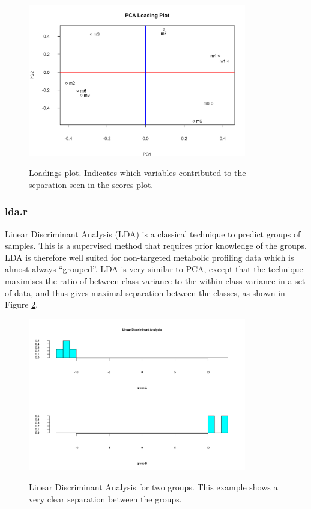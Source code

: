 \documentclass[english,a4paper,12pt]{article}
\begin{document}
\begin{figure}[p]
\centering
\includegraphics[width=0.85\textwidth]{images/PCA_loadings.png} \\
\caption[PCA - Loadings]{Loadings plot. Indicates which variables contributed to the separation seen in the scores plot.}
\label{fig:PCA_loadings}
\end{figure}

\subsubsection*{lda.r}
Linear Discriminant Analysis (LDA) is a classical technique to predict groups of samples. This is a supervised method that requires prior knowledge of the groups. LDA is therefore well suited for non-targeted metabolic profiling data which is almost always ``grouped''. LDA is very similar to PCA, except that the technique maximises the ratio of between-class variance to the within-class variance in a set of data, and thus gives maximal separation between the classes, as shown in Figure \ref{fig:LDA}.

\begin{figure}[h!tb]
\centering
\includegraphics[width=0.85\textwidth]{images/LDA.png} \\
\caption[Linear Discriminant Analysis]{Linear Discriminant Analysis for two groups. This example shows a very clear separation between the groups.}
\label{fig:LDA}
\end{figure}
\end{document}

